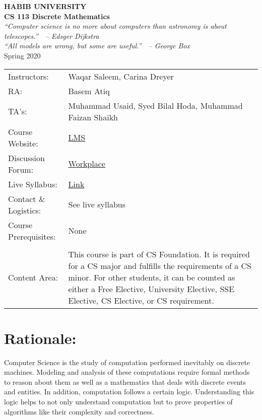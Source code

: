 \documentclass[a4paper]{article}
\begin{document}
\begin{center}

  {\LARGE\bf HABIB UNIVERSITY}\\[10pt]

  {\large\bf CS 113 Discrete Mathematics}\\[10pt]

  {\it ``Computer science is no more about computers than astronomy is about telescopes.''$\quad$-- Edsger Dijkstra}\\[10pt]
  {\it ``All models are wrong, but some are useful.''$\quad$-- George Box}\\[10pt]

  Spring 2020

\begin{tabularx}{\textwidth}{lX}
  Instructors:&  Waqar Saleem, Carina Dreyer\\
  RA:&  Basem Atiq\\
  TA's:&  Muhammad Usaid, Syed Bilal Hoda, Muhammad Faizan Shaikh\\
  Course Website:& \href{https://lms.habib.edu.pk/portal/site/3bdced2c-d399-4a25-bbb8-05ceef08fa42}{LMS}\\
  Discussion Forum:& \href{https://habibedu.workplace.com/groups/1213569312364085/}{Workplace}\\
  Live Syllabus:&  \href{https://docs.google.com/spreadsheets/d/e/2PACX-1vTkDE0uMk7tSfhTJhVDdEH_rqpBgTFo0NrGUPbbNWId1HZwK9yXZRqB7s8Ow9HRDlwoWcJp79uczqXe/pubhtml?gid=277691889}{Link} \\
  Contact \& Logistics:&  See live syllabus \\
  Course Prerequisites:&  None\\
  \\
Content Area: & This course is part of CS Foundation. It is required for a CS major and fulfills the requirements of a CS minor. For other students, it can be counted as either a Free Elective, University Elective, SSE Elective, CS Elective, or CS requirement.
\end{tabularx}

\end{center}

\section{Rationale:}

Computer Science is the study of computation performed inevitably on discrete machines. Modeling and analysis of these computations require formal methods to reason about them as well as a mathematics that deals with discrete events and entities. In addition, computation follows a certain logic. Understanding this logic helps to not only understand computation but to prove properties of algorithms like their complexity and correctness.
\end{document}
